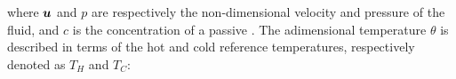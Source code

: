 where $\bm{u}$ and $p$ are respectively the non-dimensional velocity and pressure of the fluid, and $c$ is the concentration of a passive . The adimensional temperature $\theta$ is described in terms of the hot and cold reference temperatures, respectively denoted as $T_H$ and $T_C$: 
%
%
%
%
%
%
%
%
%
%
